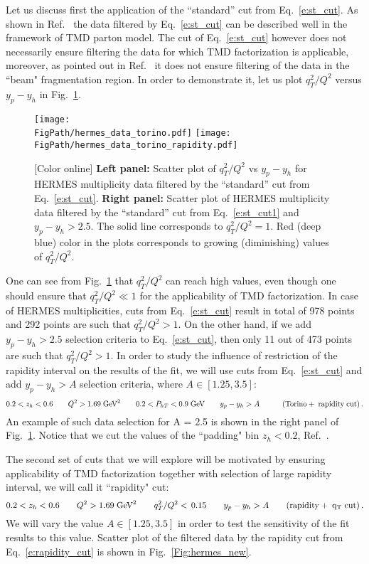 \documentclass[final,3p,times,onecolumn,sort&compress,hidelinks]{elsarticle}
\newcommand\3[1]{\boldsymbol{#1}}
\newcommand*{\FigPath}{../Figs/}%
\begin{document}
Let us discuss first the application of the ``standard'' cut from Eq.~\eqref{e:st_cut}. As shown in Ref.~\cite{Anselmino:2013lza} the data filtered by Eq.~\eqref{e:st_cut} can be described well in the framework of TMD parton model. The cut of Eq.~\eqref{e:st_cut} however does not necessarily ensure filtering the data for which TMD factorization is applicable, moreover, as pointed out in Ref.~\cite{Boglione:2016bph} it does not ensure filtering of the data in the ``beam" fragmentation region. In order to demonstrate it, let us plot $q_T^2/Q^2$ versus $y_p-y_h$ in Fig.~\ref{Fig:hermes_torino}.
\begin{figure}[htb!]
\centering
\texttt{[image: \\FigPath/hermes\_data\_torino.pdf]}
\texttt{[image: \\FigPath/hermes\_data\_torino\_rapidity.pdf]}
\caption{\label{Fig:hermes_torino}
[Color online] {\bf Left panel:} Scatter plot of $q_T^2/Q^2$ vs $y_p-y_h$ for HERMES multiplicity data filtered by the ``standard'' cut from Eq.~\eqref{e:st_cut}. {\bf Right panel:} 
Scatter plot of HERMES multiplicity data filtered by the ``standard'' cut from Eq.~\eqref{e:st_cut1} and $y_p-y_h>2.5$. The solid line corresponds to $q_T^2/Q^2=1$. Red (deep blue) color in the plots corresponds to growing (diminishing) values of $q_T^2/Q^2$.
}
\end{figure}
One can see from Fig.~\ref{Fig:hermes_torino} that $q_T^2/Q^2$ can reach high values, even though one should ensure that $q_T^2/Q^2\ll 1$ for the applicability of TMD factorization. In case of HERMES multiplicities, cuts from Eq.~\eqref{e:st_cut} result in total of 978 points and 292 points are such that $q_T^2/Q^2>1$. On the other hand, if we add $y_p-y_h>2.5$ selection criteria to Eq.~\eqref{e:st_cut}, then only 11 out of 473 points are such that $q_T^2/Q^2>1$. In order to study the influence of restriction of the rapidity interval on the results of the fit, we will use cuts from Eq.~\eqref{e:st_cut} and add $y_p-y_h>A$ selection criteria, where $A \in[1.25, 3.5]$:
\begin{equation}
0.2 < z_h < 0.6 \quad\quad Q^2 > 1.69 \; \textrm{GeV}^2  
\quad\quad 0.2 < P_{hT} < 0.9 \; \textrm{GeV} \quad\quad y_p-y_h > A  \quad\quad\quad{\rm (Torino+\;rapidity\;cut)}\,.\label{e:st_cut1}
\end{equation}
An example of such data selection for A = 2.5 is shown in the right panel of Fig.~\ref{Fig:hermes_torino}. Notice that we cut the values of the ``padding" bin $z_h<0.2$, Ref.~\cite{schnell}.

The second set of cuts that we will explore will be motivated by ensuring applicability of TMD factorization together with selection of large rapidity interval, we will call it ``rapidity" cut:
\begin{equation}
0.2 < z_h < 0.6 \quad\quad Q^2 > 1.69 \; \textrm{GeV}^2  
\quad\quad  q_T^2/Q^2 < \, 0.15   \quad\quad y_p-y_h > A \quad\quad{\rm (rapidity+\;q_T\;cut)}\,.\label{e:rapidity_cut}
\end{equation}
 We will vary the value $A \in[1.25, 3.5]$ in order to test the sensitivity of the fit results to this value. Scatter plot of the filtered data by the rapidity cut from Eq.~\eqref{e:rapidity_cut} is shown in Fig.~\ref{Fig:hermes_new}.
\end{document}
